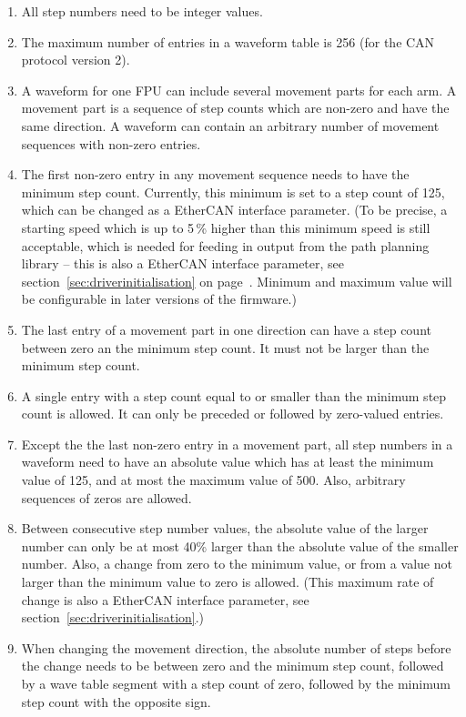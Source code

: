 \documentclass[fontsize=12,a4paper]{scrreprt}
\begin{document}
\begin{enumerate}

\item All step numbers need to be integer values.

\item The maximum number of entries in a waveform table is 256 (for
  the CAN protocol version 2).

\item A waveform for one FPU can include several movement parts for
  each arm. A movement part is a sequence of step counts which are
  non-zero and have the same direction.  A waveform can contain an
  arbitrary number of movement sequences with non-zero entries.

\item The first non-zero entry in any movement sequence needs to have
  the minimum step count.  Currently, this minimum is set to a step
  count of 125, which can be changed as a EtherCAN interface parameter. (To be
  precise, a starting speed which is up to 5\,\% higher than this
  minimum speed is still acceptable, which is needed for feeding in
  output from the path planning library -- this is also a EtherCAN interface
  parameter, see section~\ref{sec:driverinitialisation} on
  page~\pageref{sec:driverinitialisation}. Minimum and maximum value
  will be configurable in later versions of the firmware.)

\item The last entry of a movement part in one direction can have a
  step count between zero an the minimum step count. It must not be
  larger than the minimum step count.

\item A single entry with a step count equal to or smaller than the
  minimum step count is allowed. It can only be preceded or followed
  by zero-valued entries.

\item Except the the last non-zero entry in a movement part, all step
  numbers in a waveform need to have an absolute value which has at
  least the minimum value of 125, and at most the maximum value of
  500. Also, arbitrary sequences of zeros are allowed.


\item Between consecutive step number values, the absolute value of
  the larger number can only be at most 40\% larger than the absolute
  value of the smaller number. Also, a change from zero to the minimum
  value, or from a value not larger than the minimum value to zero is
  allowed. (This maximum rate of change is also a EtherCAN interface parameter, see
  section~\ref{sec:driverinitialisation}.)

\item When changing the movement direction, the absolute number of
  steps before the change needs to be between zero and the minimum
  step count, followed by a wave table segment with a step count of
  zero, followed by the minimum step count with the opposite sign.


\end{enumerate}
\end{document}
